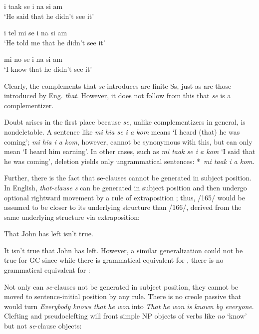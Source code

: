 \ea\label{ex:2:162}
i taak se i na si am \\
\glt `He said that he didn't see it'
\z

\ea\label{ex:2:163}
 i tel mi se i na si am\\
\glt `He told me that he didn't see it'
\z

\ea\label{ex:2:164}
mi no se i na si am\\
\glt `I know that he didn't see it'
\z

\noindent Clearly, the complements that \textit{se} introduces are finite Ss, just as are those introduced by Eng. \textit{that}. However, it does not follow from this that \textit{se} is a complementizer.

Doubt arises in the first place because \textit{se}, unlike complementizers in general, is nondeletable. A sentence like \textit{mi hia se i a kom} means `I heard (that) he was coming'; \textit{mi hia i a kom}, however, cannot be synonymous with this, but can only mean `I heard him earning'. In other cases, such as \textit{mi taak se i a kom} `I said that he was coming', deletion yields only ungrammatical sentences: *~\textit{mi taak i a kom.}

Further, there is the fact that se-clauses cannot be generated in subject position. In English, \textit{that-clause} \textit{s} can be generated in subject position and then undergo optional rightward movement by a rule of extraposition ; thus, /165/ would be assumed to be closer to its underlying structure than /166/, derived from the same underlying structure via extraposition:

\ea\label{ex:2:165}
That John has left isn't true.
\z

\ea\label{ex:2:166}
It isn't true that John has left.
\z
However, a similar generalization could not be true for GC since while there is grammatical equivalent for , there is no grammatical equivalent for :


\z

\z

Not only can \textit{se}-clauses not be generated in subject position, they cannot be moved to sentence-initial position by any rule. There is no creole passive that would turn \textit{Everybody knows that he won} into \textit{That he won is known by everyone}. Clefting and pseudoclefting will front simple NP objects of verbs like \textit{no} `know' but not \textit{se}-clause objects: 

